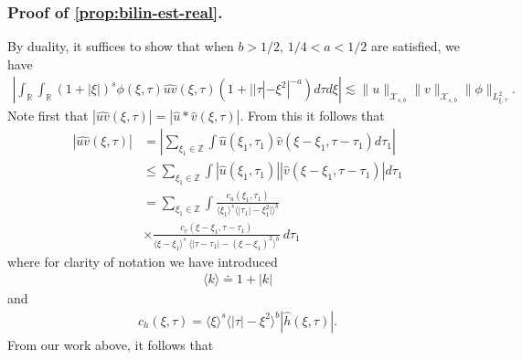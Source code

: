 \documentclass[12pt,reqno]{amsart}
\numberwithin{equation}{section}  %
\numberwithin{figure}{section}
\newcommand{\rr}{\mathbb{R}}
\newcommand{\zz}{\mathbb{Z}}
\newcommand{\wh}{\widehat}
\theoremstyle{plain}
\theoremstyle{definition}
\theoremstyle{remark}
\begin{document}
\subsubsection{Proof of \autoref{prop:bilin-est-real}.} 
\label{sssec:bilin-est-real}
By
duality, it suffices to show that when $b>1/2$, $1/4 < a <1/2$ are satisfied, we have
%
\begin{equation}
	\label{duality-est-real}
	\begin{split}
    |	\int_{\rr} \int_{\rr} (1 + |\xi|)^{s}
		\phi(\xi, \tau) \wh{uv}(\xi, \tau)(1 
    + | |\tau| - \xi^{2} |^{-a}) d \tau d \xi | \lesssim \|u\|_{\mathcal{X}_{s,b}}
    \|v\|_{\mathcal{X}_{s,b}}
    \|\phi \|_{L^{2}_{\xi, \tau}}.
	\end{split}
\end{equation}
Note first that $|\wh{uv}(\xi, \tau) |  = | \wh{u} *  \wh{v} 
(\xi, \tau)|$. From this it follows that
%
%
\begin{equation}
	\label{non-lin-rep-real}
	\begin{split}
		| \wh{uv}(\xi, \tau)|
    & = | \sum_{\xi_{1} \in \zz }  \int
    \wh{u}\left( \xi_1,  \tau_1 \right) \wh{v}\left( \xi - \xi_1 , \tau - \tau_1   
\right) d \tau_1 |
\\
& \le  \sum_{\xi_{1} \in \zz }  \int
    |\wh{u}\left( \xi_1,  \tau_1 \right)| |\wh{v}\left( \xi - \xi_1 , \tau - \tau_1   
\right)| d \tau_1 
\\
& = \sum_{\xi_1 \in \zz } \int \frac{c_u\left( \xi_1, \tau_1 
\right)}{\langle \xi_1 \rangle ^s \langle |\tau_1| - \xi_1^{2} | \rangle ^{b}}
\\
& \times \frac{c_{v}\left( \xi - \xi_1, \tau - \tau_1 \right)}{\langle \xi -
\xi_1 \rangle ^s\ \langle |\tau - \tau_1 | -  (\xi - \xi_1)^{2} \rangle^{b}}
  \ d \tau_1 
\end{split}
\end{equation}
%
%
where for clarity of notation we have introduced 
%
%
%
\begin{equation*}
\begin{split}
\langle k \rangle \doteq 1 + |k|
\end{split}
\end{equation*}
%
%
and
%
\begin{equation*}
	\begin{split}
		c_h(\xi, \tau) =
			\langle \xi \rangle ^s \langle |\tau| - \xi^{2} \rangle ^{b} | \wh{h}\left( \xi, \tau \right) |.
	\end{split}
\end{equation*}
%
%
From our work above, it follows that 
\end{document}
